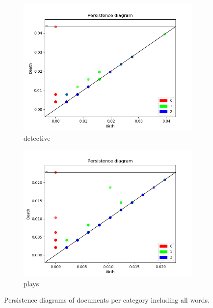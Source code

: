 \documentclass[fleqn]{article}
\begin{document}
\begin{figure}
\begin{subfigure}[t]{0.425\textwidth}
    	\includegraphics[width=\textwidth]{figures/all_words/detective.png}
    	\caption{detective}
        \label{fig:all:detective}
    \end{subfigure}\hfill
	\begin{subfigure}[t]{0.425\textwidth}
    	\includegraphics[width=\textwidth]{figures/all_words/plays.png}
    	\caption{plays}
        \label{fig:all:plays}
    \end{subfigure}\hfill
    \caption{Persistence diagrams of documents per category including all words.}
    \label{fig:all}
\end{figure}
\end{document}
